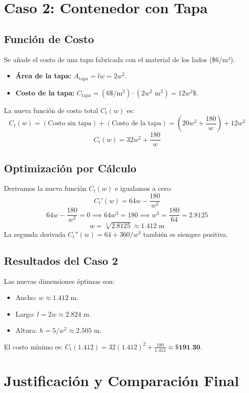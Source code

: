 \documentclass[12pt, letterpaper]{article}
\begin{document}
\section*{Caso 2: Contenedor con Tapa}

\subsection*{Función de Costo}
Se añade el costo de una tapa fabricada con el material de los lados (\$6/m²).
\begin{itemize}
    \item \textbf{Área de la tapa:} $A_{\text{tapa}} = lw = 2w^2$.
    \item \textbf{Costo de la tapa:} $C_{\text{tapa}} = (6 \$/\text{m}^2) \cdot (2w^2 \text{ m}^2) = 12w^2 \$$.
\end{itemize}
La nueva función de costo total $C_t(w)$ es:
$$ C_t(w) = (\text{Costo sin tapa}) + (\text{Costo de la tapa}) = \left(20w^2 + \frac{180}{w}\right) + 12w^2 $$
$$ C_t(w) = 32w^2 + \frac{180}{w} $$

\subsection*{Optimización por Cálculo}
Derivamos la nueva función $C_t(w)$ e igualamos a cero:
$$ C_t'(w) = 64w - \frac{180}{w^2} $$
$$ 64w - \frac{180}{w^2} = 0 \implies 64w^3 = 180 \implies w^3 = \frac{180}{64} = 2.8125 $$
$$ w = \sqrt[3]{2.8125} \approx 1.412 \text{ m} $$
La segunda derivada $C_t''(w) = 64 + 360/w^3$ también es siempre positiva.

\subsection*{Resultados del Caso 2}
Las nuevas dimensiones óptimas son:
\begin{itemize}
    \item Ancho: $w \approx 1.412$ m.
    \item Largo: $l = 2w \approx 2.824$ m.
    \item Altura: $h = 5/w^2 \approx 2.505$ m.
\end{itemize}
El costo mínimo es: $C_t(1.412) = 32(1.412)^2 + \frac{180}{1.412} \approx \textbf{\$191.30}$.

\section*{Justificación y Comparación Final}
\end{document}
